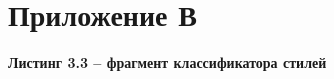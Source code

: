 \chapter*{Приложение В}\label{ux43fux440ux438ux43bux43eux436ux435ux43dux438ux435-ux432}

\textbf{Листинг 3.3 -- фрагмент классификатора стилей}


